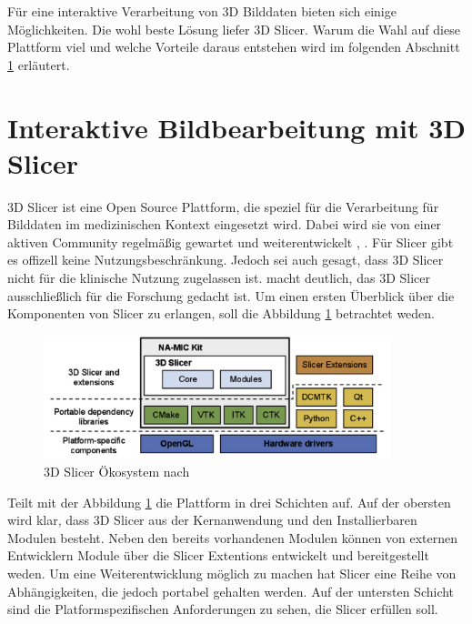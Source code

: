 Für eine interaktive Verarbeitung von 3D Bilddaten bieten sich einige Möglichkeiten.
Die wohl beste Lösung liefer 3D Slicer. Warum die Wahl auf diese Plattform viel und
welche Vorteile daraus entstehen wird im folgenden Abschnitt \ref{sec:3d_slicer}
erläutert.

\pagebreak

\section{Interaktive Bildbearbeitung mit 3D Slicer}
\label{sec:3d_slicer} 3D Slicer ist eine Open Source Plattform, die speziel für die
Verarbeitung für Bilddaten im medizinischen Kontext eingesetzt wird. Dabei wird
sie von einer aktiven Community regelmäßig gewartet und weiterentwickelt \citep[vgl.][]{slicer2024},
\citep[vgl.][]{fedorov2012slicer}. Für Slicer gibt es offizell keine
Nutzungsbeschränkung. Jedoch sei auch gesagt, dass 3D Slicer nicht für die
klinische Nutzung zugelassen ist. \citet{fedorov2012slicer} macht deutlich, das 3D
Slicer ausschließlich für die Forschung gedacht ist. Um einen ersten Überblick
über die Komponenten von Slicer zu erlangen, soll die Abbildung \ref{fig:3d_slicer_oekosystem}
betrachtet weden.

\begin{figure}[h]
	\centering
	\includegraphics[width=0.9\textwidth]{img/3d_slicer_overview.jpg}
	\caption{3D Slicer Ökosystem nach \citet[Seite 1326]{fedorov2012slicer}}
	\label{fig:3d_slicer_oekosystem}
\end{figure}

\citet[Seite 1326]{fedorov2012slicer} Teilt mit der Abbildung
\ref{fig:3d_slicer_oekosystem} die Plattform in drei Schichten auf. Auf der obersten
wird klar, dass 3D Slicer aus der Kernanwendung und den Installierbaren Modulen
besteht. Neben den bereits vorhandenen Modulen können von externen Entwicklern Module
über die Slicer Extentions entwickelt und bereitgestellt weden. Um eine
Weiterentwicklung möglich zu machen hat Slicer eine Reihe von Abhängigkeiten, die
jedoch portabel gehalten werden. Auf der untersten Schicht sind die
Platformspezifischen Anforderungen zu sehen, die Slicer erfüllen soll.

